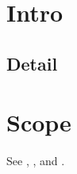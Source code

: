 \section{Intro}\label{sec:intro}
\subsection{Detail}\label{sub:detail}
\section{Scope}\label{sec:scope}
See , , and .
